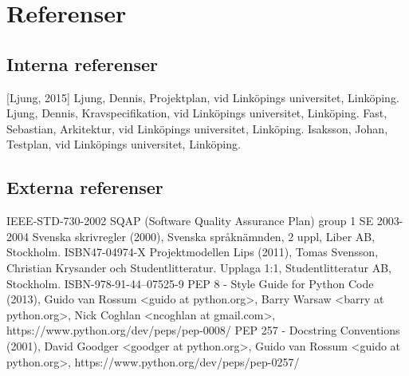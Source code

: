 \section{Referenser}


\subsection{Interna referenser}
[Ljung, 2015] Ljung, Dennis, Projektplan, vid Linköpings universitet, Linköping.
\newline
\newline
[Ljung, 2015] Ljung, Dennis, Kravspecifikation, vid Linköpings universitet, Linköping.
\newline
\newline
[Fast, 2015] Fast, Sebastian, Arkitektur, vid Linköpings universitet, Linköping.
\newline
\newline
[Isaksson, 2015] Isaksson, Johan, Testplan, vid Linköpings universitet, Linköping.

\subsection{Externa referenser}
IEEE-STD-730-2002 SQAP (Software Quality Assurance Plan) group 1 SE 2003-2004
\newline
\newline
Svenska skrivregler (2000), Svenska språknämnden, 2 uppl, Liber AB, Stockholm. ISBN47-04974-X
\newline
\newline
Projektmodellen Lips (2011), Tomas Svensson, Christian Krysander och Studentlitteratur. Upplaga 1:1, Studentlitteratur AB, Stockholm. ISBN-978-91-44--07525-9
\newline
\newline
PEP 8 - Style Guide for Python Code (2013), Guido van Rossum \textless guido at python.org\textgreater,
\newline
Barry Warsaw \textless barry at python.org\textgreater, Nick Coghlan \textless ncoghlan at gmail.com\textgreater,
\newline
https://www.python.org/dev/peps/pep-0008/
\newline
\newline
PEP 257 - Docstring Conventions (2001), David Goodger \textless goodger at python.org\textgreater, Guido van Rossum \textless guido at python.org\textgreater,
https://www.python.org/dev/peps/pep-0257/


